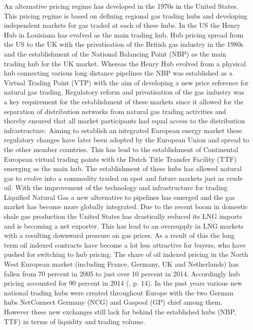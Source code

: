 An alternative pricing regime has developed in the 1970s in the United States. This pricing regime is based on defining regional gas trading hubs and developing independent markets for gas traded at each of these hubs. In the US the Henry Hub in Louisiana has evolved as the main trading hub. Hub pricing spread from the US to the UK with the privatisation of the British gas industry in the 1980s and the establishment of the National Balancing Point (NBP) as the main trading hub for the UK market. Whereas the Henry Hub evolved from a physical hub connecting various long distance pipelines the NBP was established as a Virtual Trading Point (VTP) with the aim of developing a new price reference for natural gas trading. Regulatory reform and privatisation of the gas industry was a key requirement for the establishment of these markets since it  allowed for the separation of distribution networks from natural gas trading activities and thereby ensured that all market participants had equal access to the distribution infrastructure. Aiming to establish an integrated European energy market these regulatory changes have later been adopted by the European Union and spread to the other member countries. This has lead to the establishment of Continental European virtual trading points with the Dutch Title Transfer Facility (TTF) emerging as the main hub. The establishment of these hubs has allowed natural gas to evolve into a commodity traded on spot and future markets just as crude oil. With the improvement of the technology and infrastructure for trading Liquified Natural Gas a new alternative to pipelines has emerged and the gas market has become more globally integrated. Due to the recent boom in domestic shale gas production the United States has drastically reduced its LNG imports and is becoming a net exporter. This has lead to an oversupply in LNG markets with a resulting downward pressure on gas prices. As a result of this the long term oil indexed contracts have become a lot less attractive for buyers, who have pushed for switching to hub pricing. The share of oil indexed pricing in the North West European market (including France, Germany, UK and Netherlands) has fallen from 70 percent in 2005 to just over 10 percent in 2014. Accordingly hub pricing accounted for 90 percent in 2014 (\cite{heather_evolution_2015}, p. 14). 
In the past years various new national trading hubs were created throughout Europe with the two German hubs NetConnect Germany (NCG) and Gaspool (GP) chief among them. However these new exchanges still lack far behind the established hubs (NBP, TTF) in terms of liquidity and trading volume.

